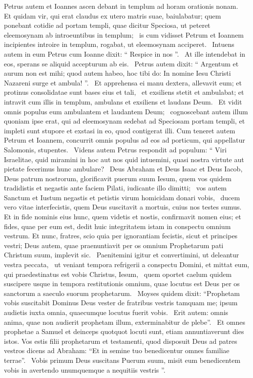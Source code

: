 \begin{biblechapter}
\begin{biblechapter}
\begin{biblechapter}
 \verse Petrus autem et Ioannes ascen debant in templum ad horam orationis nonam. 
 \verse Et quidam vir, qui erat claudus ex utero matris suae, baiulabatur; quem ponebant cotidie ad portam templi, quae dicitur Speciosa, ut peteret eleemosynam ab introeuntibus in templum; 
 \verse is cum vidisset Petrum et Ioannem incipientes introire in templum, rogabat, ut eleemosynam acciperet. 
 \verse Intuens autem in eum Petrus cum Ioanne dixit: “ Respice in nos ”. 
 \verse At ille intendebat in eos, sperans se aliquid accepturum ab eis. 
 \verse Petrus autem dixit: “ Argentum et aurum non est mihi; quod autem habeo, hoc tibi do: In nomine Iesu Christi Nazareni surge et ambula! ”. 
 \verse Et apprehensa ei manu dextera, allevavit eum; et protinus consolidatae sunt bases eius et tali, 
 \verse et exsiliens stetit et ambulabat; et intravit cum illis in templum, ambulans et exsiliens et laudans Deum. 
 \verse Et vidit omnis populus eum ambulantem et laudantem Deum; 
 \verse cognoscebant autem illum quoniam ipse erat, qui ad eleemosynam sedebat ad Speciosam portam templi, et impleti sunt stupore et exstasi in eo, quod contigerat illi.
 \verse Cum teneret autem Petrum et Ioannem, concurrit omnis populus ad eos ad porticum, qui appellatur Salomonis, stupentes. 
 \verse Videns autem Petrus respondit ad populum: “ Viri Israelitae, quid miramini in hoc aut nos quid intuemini, quasi nostra virtute aut pietate fecerimus hunc ambulare? 
 \verse Deus Abraham et Deus Isaac et Deus Iacob, Deus patrum nostrorum, glorificavit puerum suum Iesum, quem vos quidem tradidistis et negastis ante faciem Pilati, iudicante illo dimitti; 
 \verse vos autem Sanctum et Iustum negastis et petistis virum homicidam donari vobis, 
 \verse ducem vero vitae interfecistis, quem Deus suscitavit a mortuis, cuius nos testes sumus. 
 \verse Et in fide nominis eius hunc, quem videtis et nostis, confirmavit nomen eius; et fides, quae per eum est, dedit huic integritatem istam in conspectu omnium vestrum.
 \verse Et nunc, fratres, scio quia per ignorantiam fecistis, sicut et principes vestri; \verse Deus autem, quae praenuntiavit per os omnium Prophetarum pati Christum suum, implevit sic. 
\verse Paenitemini igitur et convertimini, ut deleantur vestra peccata, 
 \verse ut veniant tempora refrigerii a conspectu Domini, et mittat eum, qui praedestinatus est vobis Christus, Iesum, 
 \verse quem oportet caelum quidem suscipere usque in tempora restitutionis omnium, quae locutus est Deus per os sanctorum a saeculo suorum prophetarum. 
 \verse Moyses quidem dixit: “Prophetam vobis suscitabit Dominus Deus vester de fratribus vestris tamquam me; ipsum audietis iuxta omnia, quaecumque locutus fuerit vobis. 
 \verse Erit autem: omnis anima, quae non audierit prophetam illum, exterminabitur de plebe”. 
 \verse Et omnes prophetae a Samuel et deinceps quotquot locuti sunt, etiam annuntiaverunt dies istos.
\verse Vos estis filii prophetarum et testamenti, quod disposuit Deus ad patres vestros dicens ad Abraham: “Et in semine tuo benedicentur omnes familiae terrae”. 
 \verse Vobis primum Deus suscitans Puerum suum, misit eum benedicentem vobis in avertendo unumquemque a nequitiis vestris ”.
 

\end{biblechapter}
\end{biblechapter}
\end{biblechapter}

